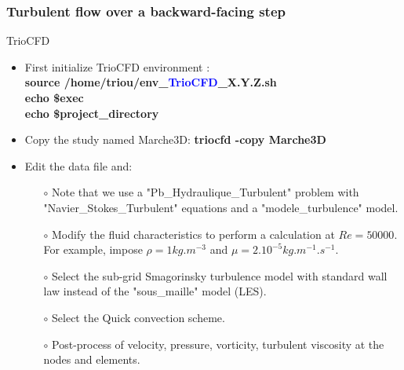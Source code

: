 \documentclass[10pt, hyperref={unicode=true,pdfusetitle, bookmarks=true,bookmarksnumbered=false,bookmarksopen=false, breaklinks=false,pdfborder={0 0 1},backref=true,colorlinks=true,linkcolor=darkblue,pageanchor}]{beamer}
\begin{document}
\begin{frame}
\frametitle{Turbulent flow over a backward-facing step}
\begin{block}{TrioCFD}

\begin{itemize}
\item First initialize TrioCFD environment :\\
{\small{
\textbf{source /home/triou/env\_\textcolor{blue}{TrioCFD}\_X.Y.Z.sh }\\
\textbf{echo \$exec} \\
\textbf{echo \$project\_directory} \\
}}

\item Copy the study named Marche3D: 
\textbf{triocfd -copy Marche3D}

\item Edit the data file and: \\
    \begin{itemize}
    \item [$\circ$] Note that we use a "Pb\_Hydraulique\_Turbulent" problem with "Navier\_Stokes\_Turbulent" equations and a "modele\_turbulence" model.
    \item [$\circ$] Modify the fluid characteristics to perform a calculation at $Re=50000$. For example, impose $\rho = 1 kg.m^{-3}$ and $\mu=2.10^{-5} kg.m^{-1}.s^{-1}$.
    \item [$\circ$] Select the sub-grid Smagorinsky turbulence model with standard wall law instead of the "sous\_maille" model (LES).
    \item [$\circ$] Select the Quick convection scheme.
    \item [$\circ$] Post-process of velocity, pressure, vorticity, turbulent viscosity at the nodes and elements.
    \end{itemize}

\end{itemize}

\end{block}
\end{frame}
\end{document}
